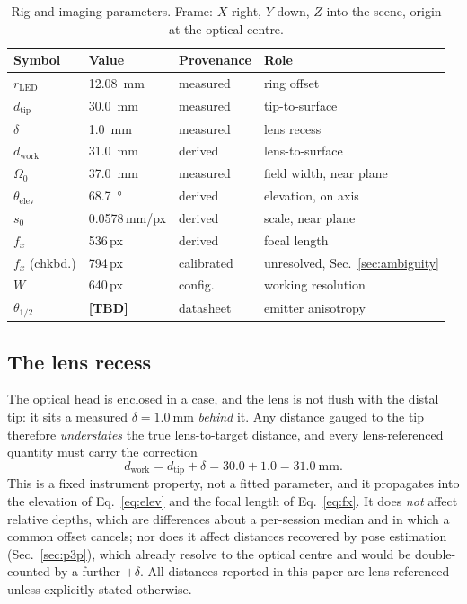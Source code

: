 \documentclass[journal,10pt]{IEEEtran}
\newcommand{\TODO}[1]{\textcolor{todoRed}{\textbf{[#1]}}}
\begin{document}
\begin{table}[t]
\centering
\caption{Rig and imaging parameters. Frame: $X$ right, $Y$ down, $Z$ into the
scene, origin at the optical centre.}
\label{tab:geom}
\footnotesize
\begin{tabular}{@{}ll l p{}@{}}
\toprule
\textbf{Symbol} & \textbf{Value} & \textbf{Provenance} & \textbf{Role} \\
\midrule
$r_\mathrm{LED}$ & \SI{12.08}{\milli\metre} & measured & ring offset \\
$d_\mathrm{tip}$ & \SI{30.0}{\milli\metre}  & measured & tip-to-surface \\
$\delta$         & \SI{1.0}{\milli\metre}   & measured & lens recess \\
$d_\mathrm{work}$& \SI{31.0}{\milli\metre}  & derived  & lens-to-surface \\
$\Omega_0$       & \SI{37.0}{\milli\metre}  & measured & field width, near plane \\
$\theta_\mathrm{elev}$ & \SI{68.7}{\degree} & derived  & elevation, on axis \\
$s_0$            & \num{0.0578}\,mm/px      & derived  & scale, near plane \\
$f_x$            & \num{536}\,px            & derived  & focal length \\
$f_x$ (chkbd.)   & \num{794}\,px            & calibrated & unresolved, Sec.~\ref{sec:ambiguity} \\
$W$              & \num{640}\,px            & config.  & working resolution \\
$\theta_{1/2}$   & \TODO{TBD}               & datasheet & emitter anisotropy \\
\bottomrule
\end{tabular}
\end{table}

\subsection{The lens recess}\label{sec:recess}
The optical head is enclosed in a case, and the lens is not flush with the
distal tip: it sits a measured $\delta=\SI{1.0}{\milli\metre}$ \emph{behind} it.
Any distance gauged to the tip therefore \emph{understates} the true
lens-to-target distance, and every lens-referenced quantity must carry the
correction
\begin{equation}
d_\mathrm{work} = d_\mathrm{tip} + \delta = 30.0 + 1.0 = \SI{31.0}{\milli\metre}.
\label{eq:recess}
\end{equation}
This is a fixed instrument property, not a fitted parameter, and it propagates
into the elevation of Eq.~\eqref{eq:elev} and the focal length of
Eq.~\eqref{eq:fx}. It does \emph{not} affect relative depths, which are
differences about a per-session median and in which a common offset cancels; nor
does it affect distances recovered by pose estimation
(Sec.~\ref{sec:p3p}), which already resolve to the optical centre and would be
double-counted by a further $+\delta$. All distances reported in this paper are
lens-referenced unless explicitly stated otherwise.
\end{document}
